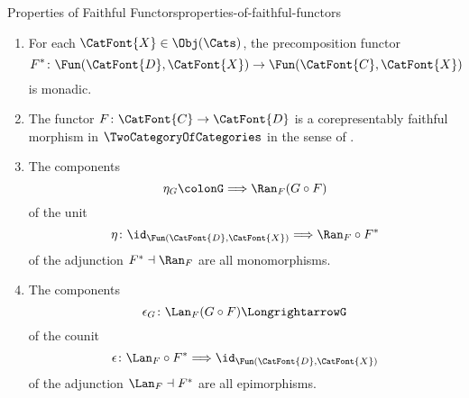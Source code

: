 \begin{proposition}{Properties of Faithful Functors}{properties-of-faithful-functors}
\begin{enumerate}
\begin{enumerate}
\[                        \Fun(\CatFont{D},\CatFont{X})
                        \to
                        \Fun(\CatFont{C},\CatFont{X})
                    \]%
                    is conservative.
                \item\label{properties-of-faithful-functors-interaction-with-precomposition-3-c}For each $\CatFont{X}\in\Obj(\Cats)$, the precomposition functor
                    \[
                        F^{*}
                        \colon
                        \Fun(\CatFont{D},\CatFont{X})
                        \to
                        \Fun(\CatFont{C},\CatFont{X})
                    \]%
                    is monadic.
                \item\label{properties-of-faithful-functors-interaction-with-precomposition-3-d}The functor $F\colon\CatFont{C}\to\CatFont{D}$ is a corepresentably faithful morphism in $\TwoCategoryOfCategories$ in the sense of .
                \item\label{properties-of-faithful-functors-interaction-with-precomposition-3-e}The components
                    \[
                        \eta_{G}%
                        \colon%
                        G%
                        \Longrightarrow%
                        \Ran_{F}(G\circ F)%
                    \]%
                    of the unit
                    \[
                        \eta%
                        \colon%
                        \id_{\Fun(\CatFont{D},\CatFont{X})}%
                        \Longrightarrow%
                        \Ran_{F}\circ F^{*}%
                    \]%
                    of the adjunction $F^{*}\dashv\Ran_{F}$ are all monomorphisms.
                \item\label{properties-of-faithful-functors-interaction-with-precomposition-3-f}The components
                    \[
                        \epsilon_{G}%
                        \colon%
                        \Lan_{F}(G\circ F)%
                        \Longrightarrow%
                        G%
                    \]%
                    of the counit
                    \[
                        \epsilon%
                        \colon%
                        \Lan_{F}\circ F^{*}%
                        \Longrightarrow%
                        \id_{\Fun(\CatFont{D},\CatFont{X})}%
                    \]%
                    of the adjunction $\Lan_{F}\dashv F^{*}$ are all epimorphisms.

\end{enumerate}
\end{enumerate}
\end{proposition}
